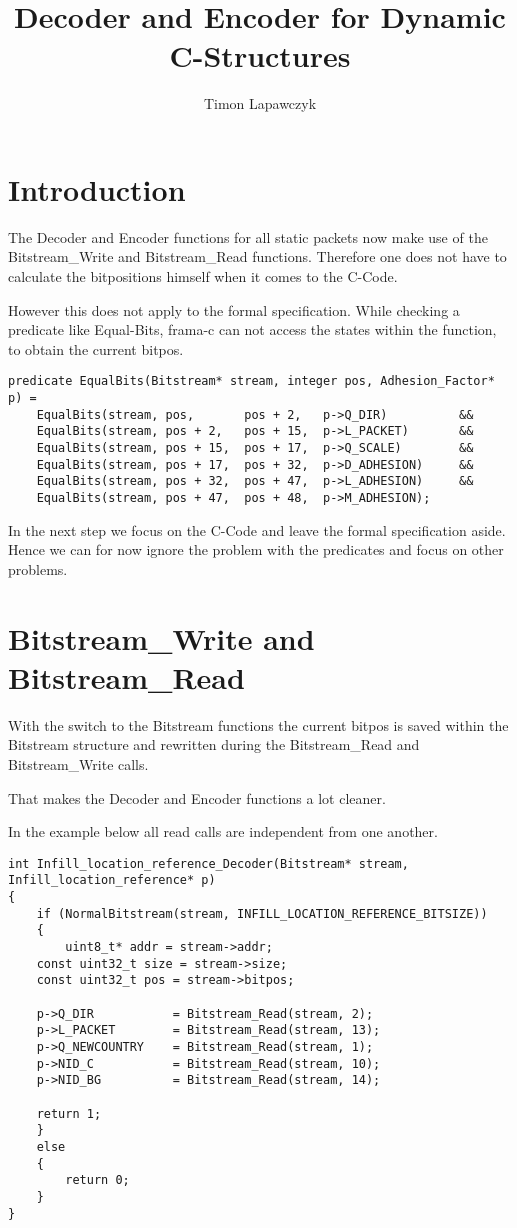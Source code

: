 \documentclass[parskip=half,paper=a4,DIV=13]{scrartcl}
\title{Decoder and Encoder for Dynamic C-Structures}
\author{Timon Lapawczyk}
\begin{document}
\maketitle

\section{Introduction}

The Decoder and Encoder functions for all static packets now make use of the Bitstream\_Write
and Bitstream\_Read functions. Therefore one does not have to calculate the bitpositions himself
when it comes to the C-Code.

However this does not apply to the formal specification.
While checking a predicate like Equal-Bits, frama-c can not access the states within the function,
to obtain the current bitpos.

\begin{lstlisting}[mathescape]
predicate EqualBits(Bitstream* stream, integer pos, Adhesion_Factor* p) =
    EqualBits(stream, pos,       pos + 2,   p->Q_DIR)          &&
    EqualBits(stream, pos + 2,   pos + 15,  p->L_PACKET)       &&
    EqualBits(stream, pos + 15,  pos + 17,  p->Q_SCALE)        &&
    EqualBits(stream, pos + 17,  pos + 32,  p->D_ADHESION)     &&
    EqualBits(stream, pos + 32,  pos + 47,  p->L_ADHESION)     &&
    EqualBits(stream, pos + 47,  pos + 48,  p->M_ADHESION);
\end{lstlisting}

In the next step we focus on the C-Code and leave the formal specification aside.
Hence we can for now ignore the problem with the predicates and focus on other problems.

\section{Bitstream\_Write and Bitstream\_Read}

With the switch to the Bitstream functions the current bitpos is saved within the Bitstream
structure and rewritten during the Bitstream\_Read and Bitstream\_Write calls.

That makes the Decoder and Encoder functions a lot cleaner.

In the example below all read calls are independent from one another.

\begin{lstlisting}[mathescape]
int Infill_location_reference_Decoder(Bitstream* stream, Infill_location_reference* p)
{
    if (NormalBitstream(stream, INFILL_LOCATION_REFERENCE_BITSIZE))
    {
        uint8_t* addr = stream->addr;
	const uint32_t size = stream->size;
	const uint32_t pos = stream->bitpos;

	p->Q_DIR           = Bitstream_Read(stream, 2);
	p->L_PACKET        = Bitstream_Read(stream, 13);
	p->Q_NEWCOUNTRY    = Bitstream_Read(stream, 1);
	p->NID_C           = Bitstream_Read(stream, 10);
	p->NID_BG          = Bitstream_Read(stream, 14);

	return 1;
    }
    else
    {
        return 0;
    }
}
\end{lstlisting}
\end{document}
